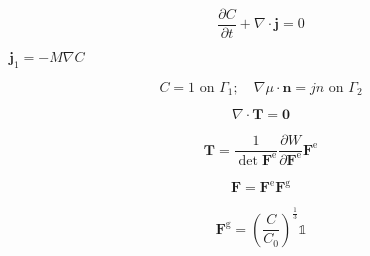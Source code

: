 \documentclass{article}
\begin{document}
\[ \frac{\partial C}{\partial t}+\nabla\cdot\boldsymbol{j}=0 \]
\pagebreak

$\boldsymbol{j}_1=-M\nabla C$
\pagebreak

\[ C=1 \text{ on }\Gamma_1; \quad \nabla \mu\cdot\boldsymbol{n}=jn \text{ on }\Gamma_2 \]
\pagebreak

\[ \nabla\cdot\boldsymbol{T} = \boldsymbol{0} \]
\pagebreak

\[ \boldsymbol{T}= \frac{1}{\det{\boldsymbol{F}^{\text{e}}}}\frac{\partial W}{\partial \boldsymbol{F}^{\text{e}}}\boldsymbol{F}^{\text{e}} \]
\pagebreak

\[ \boldsymbol{F}=\boldsymbol{F}^{\text{e}}\boldsymbol{F}^{\text{g}} \]
\pagebreak

\[ \boldsymbol{F}^{\text{g}}=\left(\frac{C}{C_\text{0}}\right)^{\frac{1}{3}}\mathbb{1} \]
\pagebreak
\end{document}
